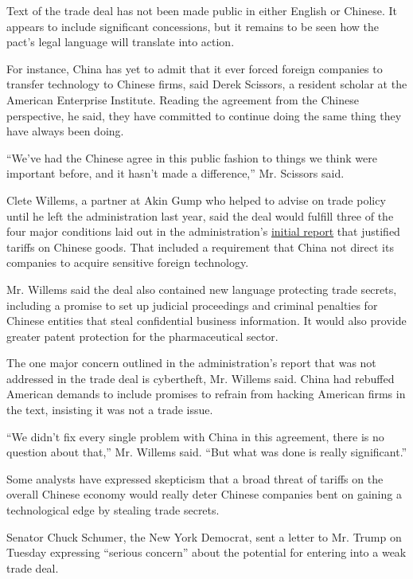 Text of the trade deal has not been made public in either English or
Chinese. It appears to include significant concessions, but it remains
to be seen how the pact's legal language will translate into action.

For instance, China has yet to admit that it ever forced foreign
companies to transfer technology to Chinese firms, said Derek Scissors,
a resident scholar at the American Enterprise Institute. Reading the
agreement from the Chinese perspective, he said, they have committed to
continue doing the same thing they have always been doing.

``We've had the Chinese agree in this public fashion to things we think
were important before, and it hasn't made a difference,'' Mr. Scissors
said.

Clete Willems, a partner at Akin Gump who helped to advise on trade
policy until he left the administration last year, said the deal would
fulfill three of the four major conditions laid out in the
administration's
\href{https://ustr.gov/sites/default/files/Section\%20301\%20FINAL.PDF}{initial
report} that justified tariffs on Chinese goods. That included a
requirement that China not direct its companies to acquire sensitive
foreign technology.

Mr. Willems said the deal also contained new language protecting trade
secrets, including a promise to set up judicial proceedings and criminal
penalties for Chinese entities that steal confidential business
information. It would also provide greater patent protection for the
pharmaceutical sector.

The one major concern outlined in the administration's report that was
not addressed in the trade deal is cybertheft, Mr. Willems said. China
had rebuffed American demands to include promises to refrain from
hacking American firms in the text, insisting it was not a trade issue.

``We didn't fix every single problem with China in this agreement, there
is no question about that,'' Mr. Willems said. ``But what was done is
really significant.''

Some analysts have expressed skepticism that a broad threat of tariffs
on the overall Chinese economy would really deter Chinese companies bent
on gaining a technological edge by stealing trade secrets.

Senator Chuck Schumer, the New York Democrat, sent a letter to Mr. Trump
on Tuesday expressing ``serious concern'' about the potential for
entering into a weak trade deal.

